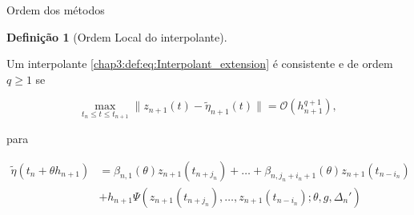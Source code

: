\documentclass{beamer}
\theoremstyle{plain}
\theoremstyle{definition}
\newtheorem{defi}{Definição}
\begin{document}
\begin{frame}{Ordem dos métodos}


    \small
    \begin{defi}[Ordem Local do interpolante]
        \label{chap3:def:interpolant_extension_order}

        Um interpolante \eqref{chap3:def:eq:Interpolant_extension} é consistente e de ordem $q \geq 1$ se


        \begin{equation}
            \max_{t_n \leq t \leq t_{n+1}}\| z_{n+1}(t) - \tilde{ \eta }_{n+1}(t) \| = \mathcal{O} (h_{n+1}^{q+1}), 
            \label{chap3:eq:Interpolant_extension_order}
        \end{equation}

        para 

        \begin{equation}
            \begin{split}
                \tilde{\eta}(t_{n} + \theta h_{n+1}) &= \beta_{n, 1}(\theta) z_{n+1}(t_{n+j_n}) + \dots + \beta_{n, j_n + i_n + 1}(\theta) z_{n+1}(t_{n-i_n}) \\
                                                     &+ h_{n+1} \Psi(z_{n+1}(t_{n+ j_n}), \dots, z_{n+1}(t_{n-i_n}); \theta,  g, \Delta_n ')
            \end{split}
            \label{chap3:def:interpolant_extension_order:eq:1}
        \end{equation}

    \end{defi}

\end{frame}



\end{document}
